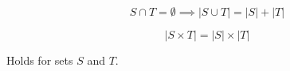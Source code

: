 
\begin{frame}{}
  \begin{theorem}
    \[
      S \cap T = \emptyset \implies |S \cup T| = |S| + |T|
    \]
  \end{theorem}

  \pause
  \vspace{0.60cm}
  \begin{theorem}
    \[
      |S \times T| = |S| \times |T|
    \]
  \end{theorem}

  \pause
  \vspace{0.60cm}
  \begin{center}
    Holds for  sets $S$ and $T$.
  \end{center}
\end{frame}

\begin{frame}{}
\end{frame}
